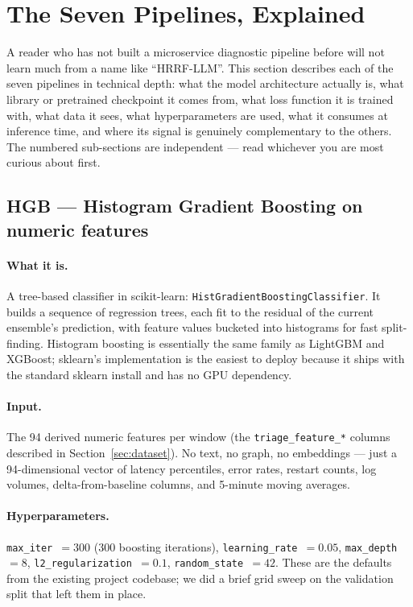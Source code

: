 \section{The Seven Pipelines, Explained}
\label{sec:pipelines}

A reader who has not built a microservice diagnostic pipeline before will not learn much from a name like ``HRRF-LLM''. This section describes each of the seven pipelines in technical depth: what the model architecture actually is, what library or pretrained checkpoint it comes from, what loss function it is trained with, what data it sees, what hyperparameters are used, what it consumes at inference time, and where its signal is genuinely complementary to the others. The numbered sub-sections are independent --- read whichever you are most curious about first.

\subsection{HGB --- Histogram Gradient Boosting on numeric features}

\paragraph{What it is.} A tree-based classifier in scikit-learn: \texttt{HistGradientBoostingClassifier}. It builds a sequence of regression trees, each fit to the residual of the current ensemble's prediction, with feature values bucketed into histograms for fast split-finding. Histogram boosting is essentially the same family as LightGBM and XGBoost; sklearn's implementation is the easiest to deploy because it ships with the standard sklearn install and has no GPU dependency.

\paragraph{Input.} The 94 derived numeric features per window (the \texttt{triage\_feature\_*} columns described in Section~\ref{sec:dataset}). No text, no graph, no embeddings --- just a 94-dimensional vector of latency percentiles, error rates, restart counts, log volumes, delta-from-baseline columns, and 5-minute moving averages.

\paragraph{Hyperparameters.} \texttt{max\_iter $= 300$} (300 boosting iterations), \texttt{learning\_rate $= 0.05$}, \texttt{max\_depth $= 8$}, \texttt{l2\_regularization $= 0.1$}, \texttt{random\_state $= 42$}. These are the defaults from the existing project codebase; we did a brief grid sweep on the validation split that left them in place.

